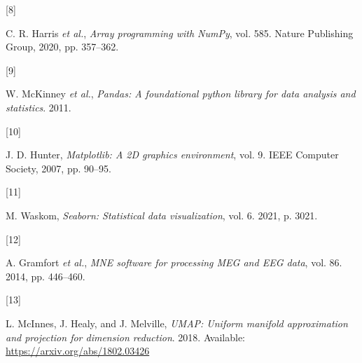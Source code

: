 \documentclass[
  letterpaper,
  DIV=11,
  numbers=noendperiod]{scrartcl}
\newlength{\cslhangindent}
\newlength{\csllabelwidth}
\newenvironment{CSLReferences}[2] %
 {\begin{list}{}{%
  \setlength{\itemindent}{0pt}
  \setlength{\leftmargin}{0pt}
  \setlength{\parsep}{0pt}
  \ifodd #1
   \setlength{\leftmargin}{\cslhangindent}
   \setlength{\itemindent}{-1\cslhangindent}
  \fi
  \setlength{\itemsep}{#2\baselineskip}}}
 {\end{list}}
\newcommand{\CSLLeftMargin}[1]{\parbox[t]{\csllabelwidth}{\strut#1\strut}}
\newcommand{\CSLRightInline}[1]{\parbox[t]{\linewidth - \csllabelwidth}{\strut#1\strut}}
\begin{document}
\begin{CSLReferences}{0}{0}
\CSLLeftMargin{{[}8{]} }%
\CSLRightInline{C. R. Harris \emph{et al.}, \emph{Array programming with
NumPy}, vol. 585. Nature Publishing Group, 2020, pp. 357--362.}

\CSLLeftMargin{{[}9{]} }%
\CSLRightInline{W. McKinney \emph{et al.}, \emph{Pandas: A foundational
python library for data analysis and statistics}. 2011.}

\CSLLeftMargin{{[}10{]} }%
\CSLRightInline{J. D. Hunter, \emph{Matplotlib: A 2D graphics
environment}, vol. 9. IEEE Computer Society, 2007, pp. 90--95.}

\CSLLeftMargin{{[}11{]} }%
\CSLRightInline{M. Waskom, \emph{Seaborn: Statistical data
visualization}, vol. 6. 2021, p. 3021.}

\CSLLeftMargin{{[}12{]} }%
\CSLRightInline{A. Gramfort \emph{et al.}, \emph{MNE software for
processing MEG and EEG data}, vol. 86. 2014, pp. 446--460.}

\CSLLeftMargin{{[}13{]} }%
\CSLRightInline{L. McInnes, J. Healy, and J. Melville, \emph{UMAP:
Uniform manifold approximation and projection for dimension reduction}.
2018. Available: \url{https://arxiv.org/abs/1802.03426}}

\end{CSLReferences}
\end{document}
